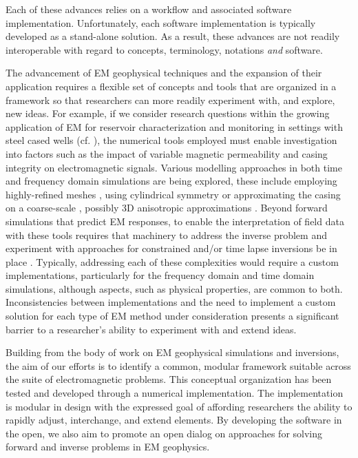 Each of these advances relies on a workflow and associated software
implementation. Unfortunately, each software implementation is typically developed as a stand-alone
solution. As a result, these advances are not readily interoperable with
regard to concepts, terminology, notations \emph{and} software.

The advancement of EM geophysical techniques and the expansion of their
application requires a flexible set of concepts and tools that are organized
in a framework so that researchers can more readily experiment with, and
explore, new ideas. For example, if we consider research questions within the
growing application of EM for reservoir characterization and monitoring in
settings with steel cased wells (cf. \cite{Hoversten2015, Um2015, Commer2015,
cuevas2014, Hoversten2014, Pardo2013}), the numerical tools employed must
enable investigation into factors such as the impact of variable magnetic
permeability \citep{wuhabashy1994, Heagy2015} and casing integrity
\citep{brill2012} on electromagnetic signals. Various modelling approaches in
both time and frequency domain simulations are being explored, these include
employing highly-refined meshes \citep{Commer2015}, using cylindrical symmetry
\citep{Heagy2015} or approximating the casing on a coarse-scale
\citep{Um2015}, possibly 3D anisotropic approximations
\citep{CaudilloMata2014}. Beyond forward simulations that predict EM
responses, to enable the interpretation of field data with these tools
requires that machinery to address the inverse problem and experiment with
approaches for constrained and/or time lapse inversions be in place
\citep{Devriese2016, Marsala2015}. Typically, addressing each of these
complexities would require a custom implementations, particularly for the
frequency domain and time domain simulations, although aspects, such as
physical properties, are common to both. Inconsistencies between
implementations and the need to implement a custom solution for each type of
EM method under consideration presents a significant barrier to a researcher's
ability to experiment with and extend ideas.

Building from the body of work on EM geophysical simulations and inversions,
the aim of our efforts is to identify a common, modular framework suitable
across the suite of electromagnetic problems. This conceptual organization has
been tested and developed through a numerical implementation. The
implementation is modular in design with the expressed goal of affording
researchers the ability to rapidly adjust, interchange, and extend elements.
By developing the software in the open, we also aim to promote an open dialog
on approaches for solving forward and inverse problems in EM geophysics.

